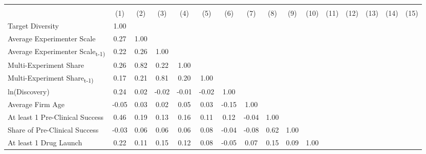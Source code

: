 {
\def\sym#1{\ifmmode^{#1}\else\(^{#1}\)\fi}
\begin{tabular}{l*{15}{c}}
\hline\hline
                &\multicolumn{15}{c}{}                                                                                                                                \\
                &      (1)&      (2)&      (3)&      (4)&      (5)&      (6)&      (7)&      (8)&      (9)&     (10)&     (11)&     (12)&     (13)&     (14)&     (15)\\
\hline
Target Diversity&     1.00&         &         &         &         &         &         &         &         &         &         &         &         &         &         \\
Average Experimenter Scale&     0.27&     1.00&         &         &         &         &         &         &         &         &         &         &         &         &         \\
Average Experimenter Scale\textsubscript{t-1)}&     0.22&     0.26&     1.00&         &         &         &         &         &         &         &         &         &         &         &         \\
Multi-Experiment Share&     0.26&     0.82&     0.22&     1.00&         &         &         &         &         &         &         &         &         &         &         \\
Multi-Experiment Share\textsubscript{t-1)}&     0.17&     0.21&     0.81&     0.20&     1.00&         &         &         &         &         &         &         &         &         &         \\
ln(Discovery)   &     0.24&     0.02&    -0.02&    -0.01&    -0.02&     1.00&         &         &         &         &         &         &         &         &         \\
Average Firm Age&    -0.05&     0.03&     0.02&     0.05&     0.03&    -0.15&     1.00&         &         &         &         &         &         &         &         \\
At least 1 Pre-Clinical Success&     0.46&     0.19&     0.13&     0.16&     0.11&     0.12&    -0.04&     1.00&         &         &         &         &         &         &         \\
Share of Pre-Clinical Success&    -0.03&     0.06&     0.06&     0.06&     0.08&    -0.04&    -0.08&     0.62&     1.00&         &         &         &         &         &         \\
At least 1 Drug Launch&     0.22&     0.11&     0.15&     0.12&     0.08&    -0.05&     0.07&     0.15&     0.09&     1.00&         &         &         &         &         \\

\end{tabular}}
